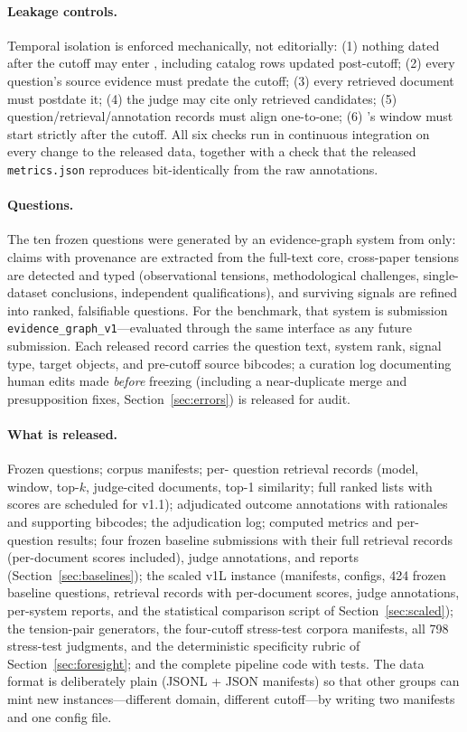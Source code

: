 \paragraph{Leakage controls.} Temporal isolation is enforced
mechanically, not editorially: (1) nothing dated after the cutoff may
enter \corpusA{}, including catalog rows updated post-cutoff; (2) every
question's source evidence must predate the cutoff; (3) every retrieved
document must postdate it; (4) the judge may cite only retrieved
candidates; (5) question/retrieval/annotation records must align
one-to-one; (6) \corpusB{}'s window must start strictly after the
cutoff. All six checks run in continuous integration on every change to
the released data, together with a check that the released
\texttt{metrics.json} reproduces bit-identically from the raw
annotations.

\paragraph{Questions.} The ten frozen questions were generated by an
evidence-graph system \citep{paper1} from \corpusA{} only: claims with
provenance are extracted from the full-text core, cross-paper tensions
are detected and typed (observational tensions, methodological
challenges, single-dataset conclusions, independent qualifications), and
surviving signals are refined into ranked, falsifiable questions. For
the benchmark, that system is submission
\texttt{evidence\_graph\_v1}---evaluated through the same interface as
any future submission. Each released record carries the question text,
system rank, signal type, target objects, and pre-cutoff source
bibcodes; a curation log documenting human edits made \emph{before}
freezing (including a near-duplicate merge and presupposition fixes,
Section~\ref{sec:errors}) is released for audit.

\paragraph{What is released.} Frozen questions; corpus manifests; per-
question retrieval records (model, window, top-$k$, judge-cited
documents, top-1 similarity; full ranked lists with scores are scheduled
for v1.1); adjudicated outcome annotations with rationales and
supporting bibcodes; the adjudication log; computed metrics and
per-question results; four frozen baseline submissions with their full
retrieval records (per-document scores included), judge annotations,
and reports (Section~\ref{sec:baselines}); the scaled v1L instance
(manifests, configs, 424 frozen baseline questions, retrieval records
with per-document scores, judge annotations, per-system reports, and
the statistical comparison script of Section~\ref{sec:scaled}); the
tension-pair generators, the four-cutoff stress-test corpora manifests,
all 798 stress-test judgments, and the deterministic specificity rubric
of Section~\ref{sec:foresight}; and the complete pipeline code with
tests. The
data format is deliberately plain (JSONL + JSON manifests) so that other
groups can mint new instances---different domain, different cutoff---by
writing two manifests and one config file.
